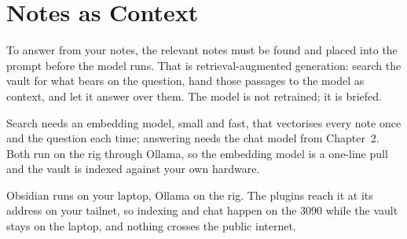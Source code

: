 
\section{Notes as Context}

 To answer from your notes, the relevant
notes must be found and placed into the prompt before the model runs. That is
retrieval-augmented generation: search the vault for what bears on the question, hand
those passages to the model as context, and let it answer over them. The model is not
retrained; it is briefed.


 Search needs an embedding model, small and fast,
that vectorises every note once and the question each time; answering needs the chat
model from Chapter~2. Both run on the rig through Ollama, so the embedding model is a
one-line pull and the vault is indexed against your own hardware.


 Obsidian runs on your laptop, Ollama on the
rig. The plugins reach it at its address on your tailnet, so indexing and
chat happen on the 3090 while the vault stays on the laptop, and nothing crosses the
public internet.


